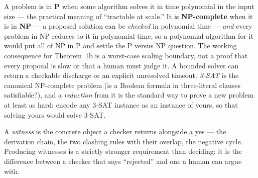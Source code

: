 \documentclass[11pt,a4paper]{article}
\begin{document}
A problem is in \textbf{P} when some algorithm solves it in time polynomial in the input size --- the practical meaning of
``tractable at scale.'' It is \textbf{NP-complete} when it is in \textbf{NP} --- a proposed solution can be \emph{checked} in
polynomial time --- \emph{and} every problem in NP reduces to it in polynomial time, so a polynomial algorithm for it would put
all of NP in P and settle the P versus NP question. The working
consequence for Theorem~1b is a worst-case scaling boundary, not a proof that every proposal is slow or that a human must
judge it. A bounded solver can return a checkable discharge or an explicit unresolved timeout. \emph{3-SAT} is the canonical NP-complete problem (is a Boolean formula in three-literal clauses
satisfiable?), and a \emph{reduction} from it is the standard way to prove a new problem at least as hard: encode any 3-SAT
instance as an instance of yours, so that solving yours would solve 3-SAT.

A \emph{witness} is the concrete object a checker returns alongside a yes --- the derivation chain, the two clashing rules
with their overlap, the negative cycle. Producing witnesses is a strictly stronger requirement than deciding: it is the
difference between a checker that says ``rejected'' and one a human can argue with.
\end{document}
